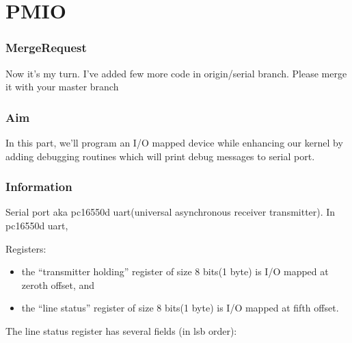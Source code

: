 \documentclass[]{book}
\newenvironment{Shaded}{}{}
\newcommand{\KeywordTok}[1]{\textbf{{#1}}}
\newcommand{\NormalTok}[1]{{#1}}
\begin{document}
\section{PMIO}\label{pmio}

\subsubsection*{MergeRequest}\label{mergerequest-1}

Now it's my turn. I've added few more code in origin/serial branch.
Please merge it with your master branch

\begin{Shaded}
\end{Shaded}

\subsubsection*{Aim}\label{aim-1}

In this part, we'll program an I/O mapped device while enhancing our
kernel by adding debugging routines which will print debug messages to
serial port.

\subsubsection*{Information}\label{information-1}

Serial port aka pc16550d uart(universal asynchronous receiver
transmitter). In pc16550d uart,

Registers:

\begin{itemize}
\itemsep1pt\parskip0pt
\item
  the ``transmitter holding'' register of size 8 bits(1 byte) is I/O
  mapped at zeroth offset, and
\item
  the ``line status'' register of size 8 bits(1 byte) is I/O mapped at
  fifth offset.
\end{itemize}

The line status register has several fields (in lsb order):
\end{document}
